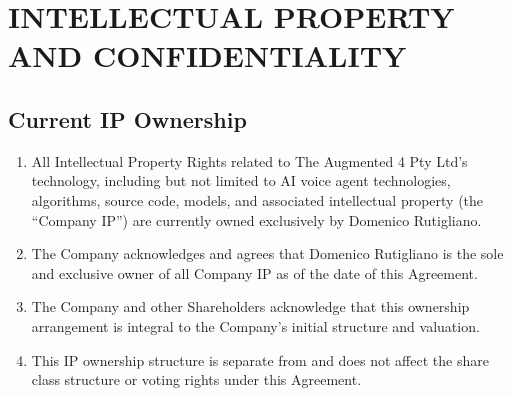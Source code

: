 \section{INTELLECTUAL PROPERTY AND CONFIDENTIALITY}

\subsection{Current IP Ownership}
\begin{enumerate}[label=(\alph*)]
\item All Intellectual Property Rights related to The Augmented 4 Pty Ltd's technology, including but not limited to AI voice agent technologies, algorithms, source code, models, and associated intellectual property (the ``Company IP'') are currently owned exclusively by Domenico Rutigliano.

\item The Company acknowledges and agrees that Domenico Rutigliano is the sole and exclusive owner of all Company IP as of the date of this Agreement.

\item The Company and other Shareholders acknowledge that this ownership arrangement is integral to the Company's initial structure and valuation.

\item This IP ownership structure is separate from and does not affect the share class structure or voting rights under this Agreement.
\end{enumerate}

